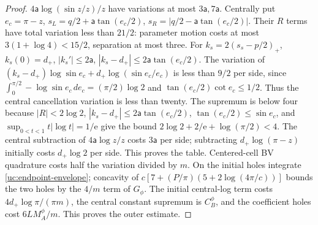 \begin{proof}
$4\mathsf{a}\log(\sin z/z)/z$ have variations at most $3\mathsf{a},7\mathsf{a}$.
Centrally put $e_c=\pi-z$, $s_L=q/2+\mathsf{a}\tan(e_c/2)$,
$s_R=|q/2-\mathsf{a}\tan(e_c/2)|$. Their $R$ terms have total variation
less than $21/2$: parameter motion costs at most
$3(1+\log4)<15/2$, separation at most three.
For $k_s=2(s_s-p/2)_+$, $k_s(0)=d_+$,
$|k_s'|\leq2\mathsf{a}$, $|k_s-d_+|\leq2\mathsf{a}\tan(e_c/2)$.
The variation of $(k_s-d_+)\log\sin e_c+d_+\log(\sin e_c/e_c)$ is
less than $9/2$ per side, since
$\int_0^{\pi/2}-\log\sin e_c\,de_c=(\pi/2)\log2$ and
$\tan(e_c/2)\cot e_c\leq1/2$. Thus the central cancellation variation
is less than twenty. The supremum is below four because
$|R|<2\log2$, $|k_s-d_+|\leq2\mathsf a\tan(e_c/2)$,
$\tan(e_c/2)\leq\sin e_c$, and
$\sup_{0<t<1}t|\log t|=1/\mathrm e$ give the bound
$2\log2+2/\mathrm e+\log(\pi/2)<4$.
The central subtraction of $4\mathsf{a}\log z/z$ costs $3\mathsf{a}$ per side;
subtracting $d_+\log(\pi-z)$ initially costs $d_+\log2$ per side.
This proves the table. Centered-cell BV quadrature costs half the
variation divided by $m$. On the initial holes integrate
\eqref{uc:endpoint-envelope}; concavity of
$c[7+(P/\pi)(5+2\log(4\pi/c))]$ bounds the two holes by the
$4/m$ term of $G_\phi$. The initial central-log term costs
$4d_+\log\pi/(\pi m)$, the central constant supremum is $C_B^\phi$,
and the coefficient holes cost $6LM_A^\phi/m$. This proves the
outer estimate.


\end{proof}
